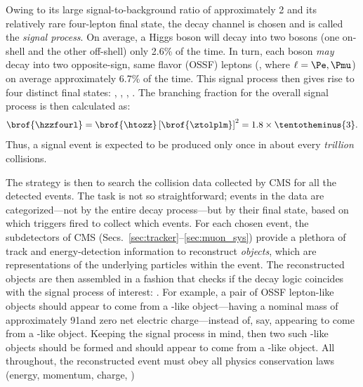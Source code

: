 Owing to its large signal-to-background ratio of approximately 2
and its relatively rare four-lepton final state, the \hzzfourl decay channel is chosen and is called the \emph{signal process}.
On average, a Higgs boson will decay into two \PZ bosons (one on-shell and the other off-shell) only 2.6\% of the time.
In turn, each \PZ boson \emph{may} decay into two opposite-sign, same flavor (OSSF) leptons (\ztolplm, where $\ell = \Pe, \Pmu$) on average approximately 6.7\% of the time.
This signal process then gives rise to four distinct final states: \foure, \fourmu, \twoetwomu, \twomutwoe.
The branching fraction for the overall signal process is then calculated as: %
\begin{equation*}
    \brof{\hzzfourl} = \brof{\htozz} \left[ \brof{\ztolplm} \right]^2 = 1.8 \times \tentotheminus{3}.
\end{equation*}
Thus, a signal event is expected to be produced only once in about every \emph{trillion} \pp collisions.

The strategy is then to search the \pp collision data collected by CMS for all the detected \hzzfourl events.
The task is not so straightforward;
events in the data are categorized---not by the entire decay process---but by their final state, based on which triggers fired to collect which events.
For each chosen event, the subdetectors of CMS (Secs.~\ref{sec:tracker}--\ref{sec:muon_sys}) provide a plethora of track and energy-detection information to reconstruct \emph{objects}, which are representations of the underlying particles within the event.
The reconstructed objects are then assembled in a fashion that checks if the decay logic coincides with the signal process of interest: \hzzfourl.
For example, a pair of OSSF lepton-like objects should appear to come from a \PZ-like object---\ie having a nominal mass of approximately 91\GeV and zero net electric charge---instead of, say, appearing to come from a \PH-like object.
Keeping the signal process in mind, then two such \PZ-like objects should be formed and should appear to come from a \PH-like object.
All throughout, the reconstructed event must obey all physics conservation laws (energy, momentum, charge, \etc)

